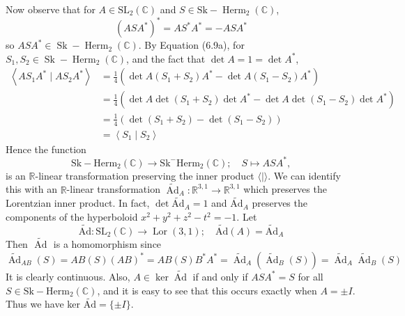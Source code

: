 \documentclass[10pt, letterpaper]{article}
\begin{document}
Now observe that for $A \in \mathrm{SL}_{2}(\mathbb{C})$ and $S \in \mathrm{Sk}-\operatorname{Herm}_{2}(\mathbb{C})$,
$$
\left(A S A^{*}\right)^{*}=A S^{*} A^{*}=-A S A^{*}
$$
so $A S A^{*} \in \operatorname{Sk}-\operatorname{Herm}_{2}(\mathbb{C})$. By Equation (6.9a), for $S_{1}, S_{2} \in \operatorname{Sk}-\operatorname{Herm}_{2}(\mathbb{C})$, and the fact that $\operatorname{det} A=1=\operatorname{det} A^{*}$,
$$
\begin{aligned}
\left\langle A S_{1} A^{*} \mid A S_{2} A^{*}\right\rangle & =\frac{1}{4}\left(\operatorname{det} A\left(S_{1}+S_{2}\right) A^{*}-\operatorname{det} A\left(S_{1}-S_{2}\right) A^{*}\right) \\
& =\frac{1}{4}\left(\operatorname{det} A \operatorname{det}\left(S_{1}+S_{2}\right) \operatorname{det} A^{*}-\operatorname{det} A \operatorname{det}\left(S_{1}-S_{2}\right) \operatorname{det} A^{*}\right) \\
& =\frac{1}{4}\left(\operatorname{det}\left(S_{1}+S_{2}\right)-\operatorname{det}\left(S_{1}-S_{2}\right)\right) \\
& =\left\langle S_{1} \mid S_{2}\right\rangle
\end{aligned}
$$
Hence the function
$$
\mathrm{Sk}-\mathrm{Herm}_{2}(\mathbb{C}) \longrightarrow \mathrm{Sk}^{-} \mathrm{Herm}_{2}(\mathbb{C}) ; \quad S \mapsto A S A^{*},
$$
is an $\mathbb{R}$-linear transformation preserving the inner product $\langle\mid\rangle$. We can identify this with an $\mathbb{R}$-linear transformation $\widetilde{\operatorname{Ad}}_{A}: \mathbb{R}^{3,1} \rightarrow \mathbb{R}^{3,1}$ which preserves the Lorentzian inner product. In fact, $\operatorname{det} \widetilde{\mathrm{Ad}}_{A}=1$ and $\widetilde{\mathrm{Ad}}_{A}$ preserves the components of the hyperboloid $x^{2}+y^{2}+z^{2}-t^{2}=-1$. Let
$$
\widetilde{\mathrm{Ad}}: \mathrm{SL}_{2}(\mathbb{C}) \longrightarrow \operatorname{Lor}(3,1) ; \quad \widetilde{\mathrm{Ad}}(A)=\widetilde{\mathrm{Ad}}_{A}
$$
Then $\widetilde{\text { Ad }}$ is a homomorphism since
$$
\widetilde{\operatorname{Ad}}_{A B}(S)=A B(S)(A B)^{*}=A B(S) B^{*} A^{*}=\widetilde{\operatorname{Ad}}_{A}\left(\widetilde{\operatorname{Ad}}_{B}(S)\right)=\widetilde{\operatorname{Ad}}_{A} \widetilde{\operatorname{Ad}}_{B}(S)
$$
It is clearly continuous. Also, $A \in \operatorname{ker} \widetilde{\operatorname{Ad}}$ if and only if $A S A^{*}=S$ for all $S \in \mathrm{Sk}-\mathrm{Herm}_{2}(\mathbb{C})$, and it is easy to see that this occurs exactly when $A= \pm I$. Thus we have ker $\widetilde{\mathrm{Ad}}=\{ \pm I\}$.
\end{document}
